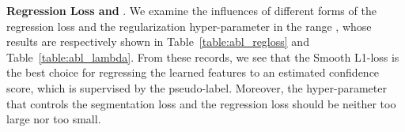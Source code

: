 \documentclass[10.5pt,twocolumn,journal,letterpaper]{IEEEtran}
\begin{document}
\textbf{Regression Loss and }. We examine the influences of different forms of the regression loss and the regularization hyper-parameter  in the range , whose results are respectively shown in Table~\ref{table:abl_regloss} and Table~\ref{table:abl_lambda}. From these records, we see that the Smooth L1-loss is the best choice for regressing the learned features to an estimated confidence score, which is supervised by the pseudo-label. Moreover, the hyper-parameter that controls the segmentation loss and the regression loss should be neither too large nor too small. 

\begin{table}[!t]
	\centering
	\caption{Different regression loss.}
	\label{table:abl_regloss}
\end{table}

\begin{table}[!t]
	\centering
	\caption{Different  of regression loss (Smooth L1).}
	\label{table:abl_lambda}
\end{table}
\end{document}
